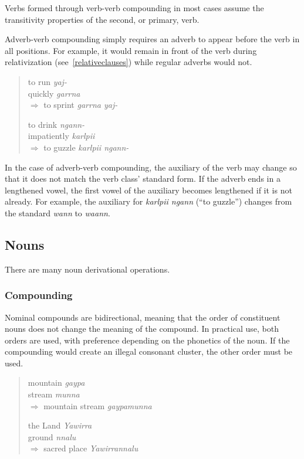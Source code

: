 Verbs formed through verb-verb compounding in most cases assume the transitivity
properties of the second, or primary, verb.

Adverb-verb compounding simply requires an adverb to appear before the verb in
all positions. For example, it would remain in front of the verb during
relativization (see~\ref{relativeclauses}) while regular adverbs would not.

\begin{quote}
\begin{multicols}{2}
to run \textit{yaj-}\\
quickly \textit{garrna}\\
$\Rightarrow$ to sprint \textit{garrna yaj-}

to drink \textit{ngann-}\\
impatiently \textit{karlpii}\\
$\Rightarrow$ to guzzle \textit{karlpii ngann-}
\end{multicols}
\end{quote}

In the case of adverb-verb compounding, the auxiliary of the verb may change so
that it does not match the verb class' standard form. If the adverb ends in a
lengthened vowel, the first vowel of the auxiliary becomes lengthened if it is
not already. For example, the auxiliary for \textit{karlpii ngann} (``to
guzzle'') changes from the standard \textit{wann} to \textit{waann}.

\subsection{Nouns}

There are many noun derivational operations.

\subsubsection{Compounding}

Nominal compounds are bidirectional, meaning that the order of constituent nouns
does not change the meaning of the compound. In practical use, both orders are
used, with preference depending on the phonetics of the noun. If the compounding
would create an illegal consonant cluster, the other order must be used.

\begin{quote}
\begin{multicols}{2}
mountain \textit{gaypa}\\
stream \textit{munna}\\
$\Rightarrow$ mountain stream \textit{gaypamunna}

the Land \textit{Yawirra}\\
ground \textit{nnalu}\\
$\Rightarrow$ sacred place \textit{Yawirrannalu}
\end{multicols}
\end{quote}

